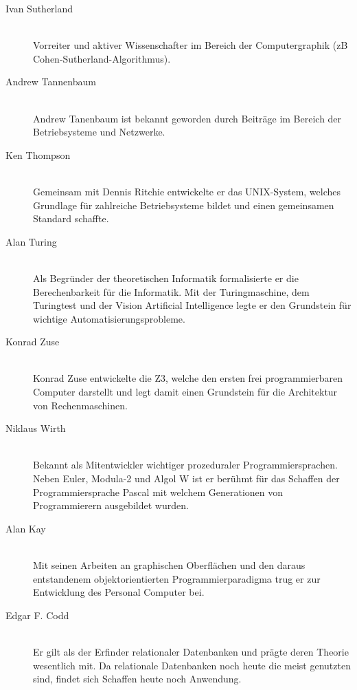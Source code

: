 \begin{description}
  \item[Ivan Sutherland ] \hfill{} \\
    Vorreiter und aktiver Wissenschafter im Bereich der Computergraphik (zB Cohen-Sutherland-Algorithmus).

  \item[Andrew Tannenbaum ] \hfill{} \\
    Andrew Tanenbaum ist bekannt geworden durch Beiträge im Bereich der Betriebsysteme und Netzwerke.

  \item[Ken Thompson ] \hfill{} \\
   Gemeinsam mit Dennis Ritchie entwickelte er das UNIX-System, welches Grundlage für zahlreiche Betriebsysteme bildet und einen gemeinsamen Standard schaffte.

  \item[Alan Turing ] \hfill{} \\
   Als Begründer der theoretischen Informatik formalisierte er die Berechenbarkeit für die Informatik. Mit der Turingmaschine, dem Turingtest und der Vision Artificial Intelligence legte er den Grundstein für wichtige Automatisierungsprobleme.

  \item[Konrad Zuse ] \hfill{} \\
   Konrad Zuse entwickelte die Z3, welche den ersten frei programmierbaren Computer darstellt und legt damit einen Grundstein für die Architektur von Rechenmaschinen.

  \item[Niklaus Wirth ] \hfill{} \\
   Bekannt als Mitentwickler wichtiger prozeduraler Programmiersprachen. Neben Euler, Modula-2 und Algol W ist er berühmt für das Schaffen der Programmiersprache Pascal mit welchem Generationen von Programmierern ausgebildet wurden.

  \item[Alan Kay ] \hfill{} \\
   Mit seinen Arbeiten an graphischen Oberflächen und den daraus entstandenem objektorientierten Programmierparadigma trug er zur Entwicklung des Personal Computer bei.

  \item[Edgar F. Codd ] \hfill{} \\
   Er gilt als der Erfinder relationaler Datenbanken und prägte deren Theorie wesentlich mit. Da relationale Datenbanken noch heute die meist genutzten sind, findet sich Schaffen heute noch Anwendung.
\end{description}
